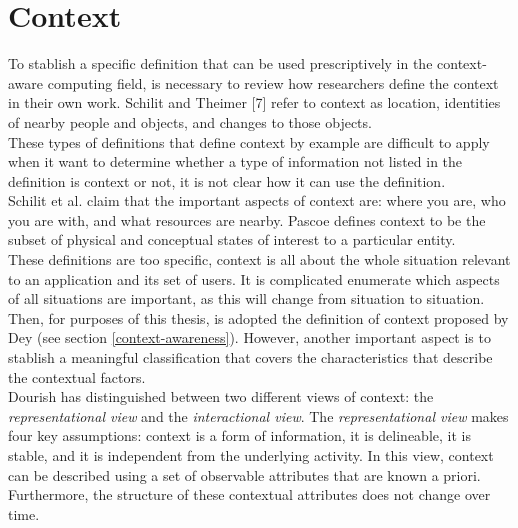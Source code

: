 \section{Context}
To stablish a specific definition that can be used prescriptively in
the context-aware computing field, is necessary to review how
researchers define the context in their own work. Schilit and Theimer
[7] refer to context as location, identities of nearby people and
objects, and changes to those objects.\\These types of definitions that
define context by example are difficult to apply when it want to
determine whether a type of information not listed in the definition
is context or not, it is not clear how it can use the definition.\\ 
Schilit et al. claim that the important aspects of context are: where
you are, who you are with, and what resources are nearby. Pascoe
defines context to be the subset of physical and conceptual states of
interest to a particular entity.\\These definitions are too specific,
context is all about the whole situation relevant to an application
and its set of users. It is complicated enumerate which aspects of all
situations are important, as this will change from situation to
situation.
Then, for purposes of this thesis, is adopted the definition of context 
proposed by Dey\cite{dey2001understanding} (see section \ref{context-awareness}). 
However, another important aspect is to stablish a meaningful 
classification that covers the characteristics that describe 
the contextual factors.\\ 
Dourish\cite{dourish2004we} has distinguished between two different
views of context: the \textit{representational view} and the
\textit{interactional view}. The \textit{representational view} makes
four key assumptions: context is a form of information, it is
delineable, it is stable, and it is independent from the underlying
activity. In this view, context can be described using a set of
observable attributes that are known a priori. Furthermore, the
structure of these contextual attributes does not change over time.

